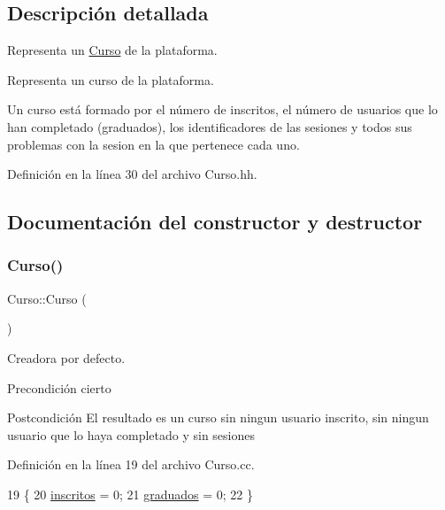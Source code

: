 \subsection{Descripción detallada}
Representa un \mbox{\hyperlink{class_curso}{Curso}} de la plataforma. 

Representa un curso de la plataforma.

Un curso está formado por el número de inscritos, el número de usuarios que lo han completado (graduados), los identificadores de las sesiones y todos sus problemas con la sesion en la que pertenece cada uno. 

Definición en la línea 30 del archivo Curso.\+hh.



\subsection{Documentación del constructor y destructor}
\mbox{\label{class_curso_add3bcc7fd065fa02b8fad76cedcc3a8a}} 
\subsubsection{\texorpdfstring{Curso()}{Curso()}}
{\footnotesize\ttfamily Curso\+::\+Curso (\begin{DoxyParamCaption}{ }\end{DoxyParamCaption})}



Creadora por defecto. 

\begin{DoxyPrecond}{Precondición}
cierto 
\end{DoxyPrecond}
\begin{DoxyPostcond}{Postcondición}
El resultado es un curso sin ningun usuario inscrito, sin ningun usuario que lo haya completado y sin sesiones 
\end{DoxyPostcond}


Definición en la línea 19 del archivo Curso.\+cc.


\begin{DoxyCode}
19                    \{
20         \mbox{\hyperlink{class_curso_aef03f588dd91d57a6e679d05148fd971}{inscritos}} = 0;
21         \mbox{\hyperlink{class_curso_abf52f538c449c083d4c067a3329c6af2}{graduados}} = 0;
22       \}
\end{DoxyCode}


